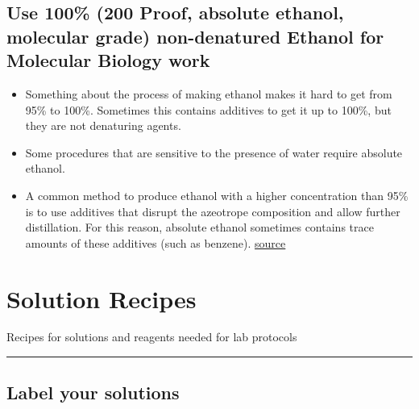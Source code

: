 \documentclass[
  letterpaper,
  DIV=11,
  numbers=noendperiod]{scrreprt}
\begin{document}
\hypertarget{use-100-200-proof-absolute-ethanol-molecular-grade-non-denatured-ethanol-for-molecular-biology-work}{%
\section*{\texorpdfstring{\textbf{Use 100\% (200 Proof, absolute
ethanol, molecular grade) non-denatured Ethanol for Molecular Biology
work}}{Use 100\% (200 Proof, absolute ethanol, molecular grade) non-denatured Ethanol for Molecular Biology work}}\label{use-100-200-proof-absolute-ethanol-molecular-grade-non-denatured-ethanol-for-molecular-biology-work}}


\begin{itemize}
\item
  Something about the process of making ethanol makes it hard to get
  from 95\% to 100\%. Sometimes this contains additives to get it up to
  100\%, but they are not denaturing agents.
\item
  Some procedures that are sensitive to the presence of water require
  absolute ethanol.
\item
  A common method to produce ethanol with a higher concentration than
  95\% is to use additives that disrupt the azeotrope composition and
  allow further distillation. For this reason, absolute ethanol
  sometimes contains trace amounts of these additives (such as benzene).
  \href{https://bitesizebio.com/13518/which-type-of-ethanol-should-i-use/}{source}
\end{itemize}

\hypertarget{solution-recipes}{%
\chapter{Solution Recipes}\label{solution-recipes}}

Recipes for solutions and reagents needed for lab protocols

\begin{center}\rule{0.5\linewidth}{0.5pt}\end{center}

\hypertarget{label-your-solutions}{%
\section*{\texorpdfstring{\textbf{Label your
solutions}}{Label your solutions}}\label{label-your-solutions}}
\end{document}

